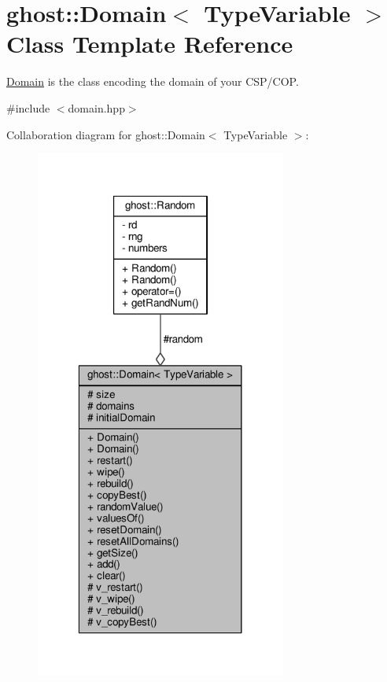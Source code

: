 \hypertarget{classghost_1_1Domain}{\section{ghost\-:\-:Domain$<$ Type\-Variable $>$ Class Template Reference}
\label{classghost_1_1Domain}
}


\hyperlink{classghost_1_1Domain}{Domain} is the class encoding the domain of your C\-S\-P/\-C\-O\-P.  




{\ttfamily \#include $<$domain.\-hpp$>$}



Collaboration diagram for ghost\-:\-:Domain$<$ Type\-Variable $>$\-:
\nopagebreak
\begin{figure}[H]
\begin{center}
\leavevmode
\includegraphics[width=234pt]{classghost_1_1Domain__coll__graph}
\end{center}
\end{figure}
